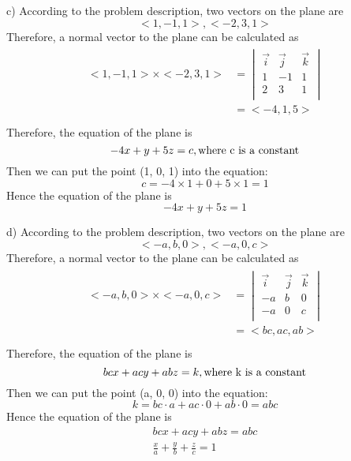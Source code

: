\documentclass{article}
\begin{document}
c) According to the problem description, two vectors on the plane are
\[ <1, -1, 1>, <-2, 3, 1> \]
Therefore, a normal vector to the plane can be calculated as
\begin{gather*}
  \begin{split}
    <1, -1, 1> \times <-2, 3, 1> 
    &= \begin{vmatrix}
         \vec{i} & \vec{j} & \vec{k} \\
         1 & -1 & 1 \\
         2 & 3 & 1 \\
       \end{vmatrix} \\
    &= <-4, 1, 5> \\
  \end{split}
\end{gather*}
Therefore, the equation of the plane is
\[ -4x + y + 5z = c, \textnormal{where c is a constant} \]
Then we can put the point (1, 0, 1) into the equation:
\[ c = -4 \times 1 + 0 + 5 \times 1 = 1 \]
Hence the equation of the plane is 
\[ -4x + y + 5z = 1 \]

d) According to the problem description, two vectors on the plane are
\[ <-a, b, 0>, <-a, 0, c> \]
Therefore, a normal vector to the plane can be calculated as
\begin{gather*}
  \begin{split}
    <-a, b, 0> \times <-a, 0, c> 
    &= \begin{vmatrix}
         \vec{i} & \vec{j} & \vec{k} \\
         -a & b & 0 \\
         -a & 0 & c \\
       \end{vmatrix} \\
    &= <bc, ac, ab> \\
  \end{split}
\end{gather*}
Therefore, the equation of the plane is
\[ bcx + acy + abz = k, \textnormal{where k is a constant} \]
Then we can put the point (a, 0, 0) into the equation:
\[ k = bc \cdot a + ac \cdot 0 + ab \cdot 0 = abc \]
Hence the equation of the plane is 
\begin{gather*}
   bcx + acy + abz = abc \\
   \frac{x}{a} + \frac{y}{b} + \frac{z}{c} = 1 \\
\end{gather*}
\end{document}
